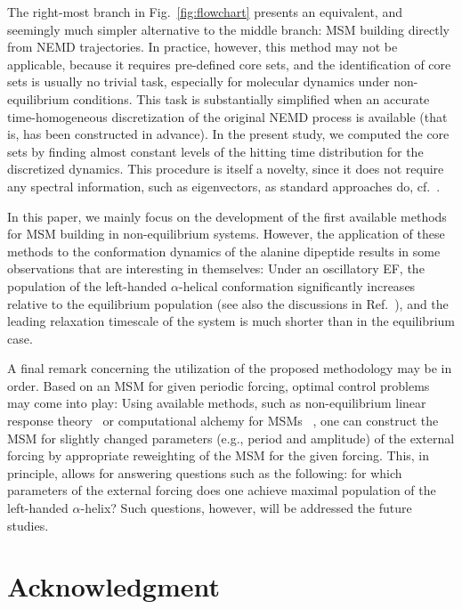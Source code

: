 \documentclass[journal=jctcce,manuscript=article]{achemso}
\begin{document}
The right-most branch in Fig.~\ref{fig:flowchart} presents an
equivalent, and seemingly
much simpler alternative to the middle branch: MSM building directly from NEMD trajectories.
In practice, however, this method may not be applicable, because
it requires pre-defined core sets, and the identification of core sets is 
usually  no trivial task, especially for molecular dynamics under non-equilibrium conditions.
This task is substantially simplified when an accurate time-homogeneous discretization 
of the original NEMD process is available (that is, has been constructed in advance).
In the present study, we computed the core sets by
finding almost constant levels of the hitting time distribution for the discretized dynamics. 
This procedure is itself a novelty, since it does not require any spectral information, such as eigenvectors, as standard approaches do, cf.~\cite{prinz2011markov,A19-1}.


In this paper, we mainly focus on the development of the first available methods for MSM
building in non-equilibrium systems.
However, the application of these methods to the conformation dynamics of the alanine dipeptide results in some observations that are interesting in themselves: Under an
oscillatory EF, the population of the left-handed $\alpha$-helical conformation
significantly increases relative to the equilibrium population
(see also the discussions in Ref.~\cite{wang2014exploring}),
and the leading relaxation timescale of the system is much shorter than in the equilibrium case.

A final remark concerning the utilization of the proposed methodology may be in order. 
Based on an MSM for given periodic forcing, optimal control problems may come into play:
Using available methods, such as non-equilibrium
linear response theory~\cite{wang2013linear} or computational alchemy for MSMs ~\cite{schutte2014markov}, one can construct the MSM for slightly changed parameters (e.g., period and amplitude) of the external forcing by appropriate reweighting of the MSM for the given forcing. This, in principle, allows for  answering questions such as the following:
for which parameters of the external forcing does one achieve maximal population of  the left-handed $\alpha$-helix?
Such questions, however, will
be addressed the future studies.


\section*{Acknowledgment}
\end{document}
